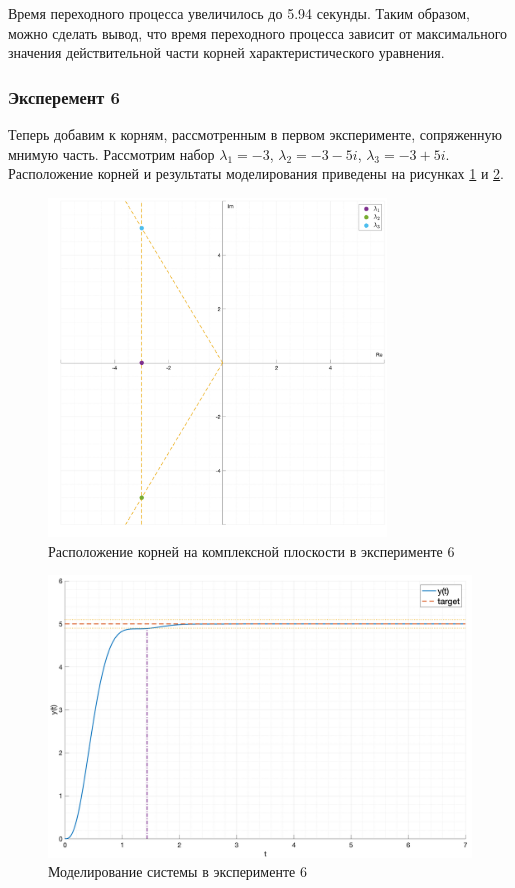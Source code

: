 Время переходного процесса увеличилось до 5.94 секунды. Таким образом, 
можно сделать вывод, что время переходного процесса зависит от максимального 
значения действительной части корней характеристического уравнения. 

\subsubsection{Эксперемент 6}
\label{task2_case6}
Теперь добавим к корням, рассмотренным в первом эксперименте, сопряженную мнимую часть. 
Рассмотрим набор $\lambda_1 = -3$, $\lambda_2 = -3 - 5i$, $\lambda_3 = -3 + 5i$.
Расположение корней и результаты моделирования приведены на рисунках
\ref{fig:task_2_points6} и \ref{fig:task_2_case6}.

\begin{figure}
    \centering
    \includegraphics[width=0.8\textwidth]{media/plots/task2_points6.png}
    \caption{Расположение корней на комплексной плоскости в эксперименте 6}
    \label{fig:task_2_points6}
\end{figure}

\begin{figure}
    \centering
    \includegraphics[width=\textwidth]{media/plots/task2_case6.png}
    \caption{Моделирование системы в эксперименте 6}
    \label{fig:task_2_case6}
\end{figure}

